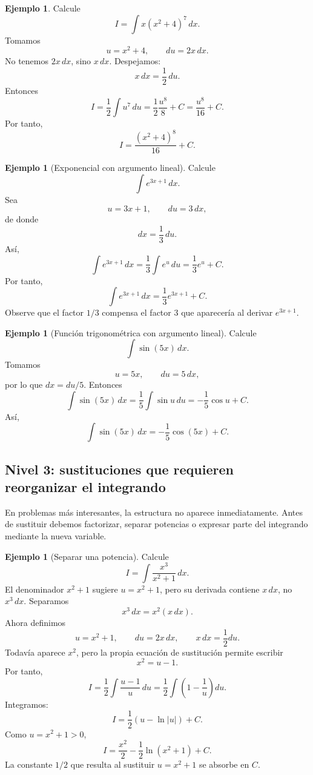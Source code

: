 \documentclass[12pt]{article}
\theoremstyle{definition}\newtheorem{definicion}[teorema]{Definición}\newtheorem{ejemplo}[teorema]{Ejemplo}\newtheorem{ejercicio}[teorema]{Ejercicio}
\theoremstyle{remark}\newtheorem*{observacion}{Observación}\newtheorem*{advertencia}{Advertencia}\newtheorem*{estrategia}{Estrategia}
\begin{document}
\begin{ejemplo}
Calcule
\[
I=\int x(x^2+4)^7\,dx.
\]
Tomamos
\[
u=x^2+4,\qquad du=2x\,dx.
\]
No tenemos $2x\,dx$, sino $x\,dx$. Despejamos:
\[
x\,dx=\frac12\,du.
\]
Entonces
\[
I=\frac12\int u^7\,du
=\frac12\frac{u^8}{8}+C
=\frac{u^8}{16}+C.
\]
Por tanto,
\[
\boxed{I=\frac{(x^2+4)^8}{16}+C.}
\]
\end{ejemplo}

\begin{ejemplo}[Exponencial con argumento lineal]
Calcule
\[
\int e^{3x+1}\,dx.
\]
Sea
\[
u=3x+1,\qquad du=3\,dx,
\]
de donde
\[
dx=\frac13\,du.
\]
Así,
\[
\int e^{3x+1}\,dx
=\frac13\int e^u\,du
=\frac13e^u+C.
\]
Por tanto,
\[
\boxed{\int e^{3x+1}\,dx=\frac13e^{3x+1}+C.}
\]
Observe que el factor $1/3$ compensa el factor $3$ que aparecería al derivar $e^{3x+1}$.
\end{ejemplo}

\begin{ejemplo}[Función trigonométrica con argumento lineal]
Calcule
\[
\int\sin(5x)\,dx.
\]
Tomamos
\[
u=5x,\qquad du=5\,dx,
\]
por lo que $dx=du/5$. Entonces
\[
\int\sin(5x)\,dx
=\frac15\int\sin u\,du
=-\frac15\cos u+C.
\]
Así,
\[
\boxed{\int\sin(5x)\,dx=-\frac15\cos(5x)+C.}
\]
\end{ejemplo}

\subsection{Nivel 3: sustituciones que requieren reorganizar el integrando}

En problemas más interesantes, la estructura no aparece inmediatamente. Antes de sustituir debemos factorizar, separar potencias o expresar parte del integrando mediante la nueva variable.

\begin{ejemplo}[Separar una potencia]
Calcule
\[
I=\int\frac{x^3}{x^2+1}\,dx.
\]
El denominador $x^2+1$ sugiere $u=x^2+1$, pero su derivada contiene $x\,dx$, no $x^3\,dx$. Separamos
\[
x^3\,dx=x^2(x\,dx).
\]
Ahora definimos
\[
u=x^2+1,\qquad du=2x\,dx,
\qquad x\,dx=\frac12du.
\]
Todavía aparece $x^2$, pero la propia ecuación de sustitución permite escribir
\[
x^2=u-1.
\]
Por tanto,
\[
I=\frac12\int\frac{u-1}{u}\,du
=\frac12\int\left(1-\frac1u\right)du.
\]
Integramos:
\[
I=\frac12(u-\ln|u|)+C.
\]
Como $u=x^2+1>0$,
\[
\boxed{I=\frac{x^2}{2}-\frac12\ln(x^2+1)+C.}
\]
La constante $1/2$ que resulta al sustituir $u=x^2+1$ se absorbe en $C$.
\end{ejemplo}
\end{document}
